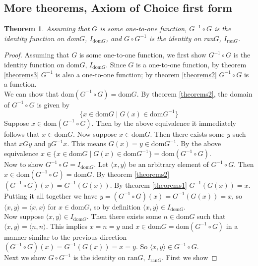 \documentclass{report}
\newtheorem{theorem}[theo]{Theorem}
\begin{document}
\subsection{More theorems, Axiom of Choice first form}
\begin{theorem}
Assuming that $G$ is some one-to-one function, $G^{-1}\circ G$ is the identity function on dom$G$, $I_{\text{dom}G}$,
and $G\circ G^{-1}$ is the identity on ran$G$, $I_{\text{ran}G}$.
\end{theorem}
\begin{proof}
Assuming that $G$ is some one-to-one function, we first show $G^{-1}\circ G$ is the identity function on dom$G$, $I_{\text{dom}G}$. Since $G$ is a one-to-one function, by theorem \ref{theorems3} 
$G^{-1}$ is also a one-to-one function; 
by theorem \ref{theorems2} $G^{-1}\circ G$ is a function.\\
\indent We can show that $\text{dom}(G^{-1}\circ G)=\text{dom}G$. By theorem \ref{theorems2}, the domain of $G^{-1}\circ G$ is given by
\begin{equation*}
\{x\in\text{dom}G\mid G(x)\in\text{dom}G^{-1}\}
\end{equation*}
Suppose $x\in\text{dom}(G^{-1}\circ G)$. Then by the above equivalence it immediately follows that $x\in\text{dom}G$. Now suppose $x\in\text{dom}G$. 
Then there exists some $y$ such that $xGy$ and $yG^{-1}x$. This means $G(x)=y\in\text{dom}G^{-1}$. By the above equivalence 
$x\in\{x\in\text{dom}G\mid G(x)\in\text{dom}G^{-1}\}=\text{dom}(G^{-1}\circ G)$.\\
\indent Now to show $G^{-1}\circ G=I_{\text{dom}G}$. Let $\langle x,y\rangle$ be an arbitrary element of $G^{-1}\circ G$. Then $x\in\text{dom}(G^{-1}\circ G)=\text{dom}G$. By theorem \ref{theorems2}
$(G^{-1}\circ G)(x)=G^{-1}(G(x))$. By theorem \ref{theorems1} $G^{-1}(G(x))=x$.
Putting it all together we have $y=(G^{-1}\circ G)(x)=G^{-1}(G(x))=x$, so $\langle x,y\rangle=\langle x,x\rangle$ for $x\in\text{dom}G$, so by definition $\langle x,y\rangle\in I_{\text{dom}G}$.\\
\indent Now suppose $\langle x,y\rangle\in I_{\text{dom}G}$. Then there exists some $n\in\text{dom}G$ such that $\langle x,y\rangle=\langle n,n\rangle$. 
This implies $x=n=y$ and $x\in\text{dom}G=\text{dom}(G^{-1}\circ G)$ in a manner similar to the previous direction $(G^{-1}\circ G)(x)=G^{-1}(G(x))=x=y$. So $\langle x,y\rangle\in G^{-1}\circ G$.\\
\indent Next we show $G\circ G^{-1}$ is the identity on ran$G$, $I_{\text{ran}G}$. First we show 

\end{proof}
\end{document}
